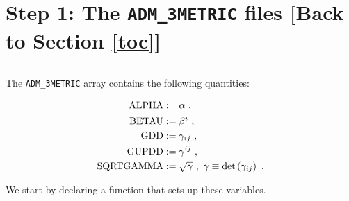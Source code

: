\documentclass[landscape,letterpaper,10pt,english]{article}
\begin{document}
    \section{\texorpdfstring{Step 1: The \texttt{ADM\_3METRIC} files {[}Back
to
Section \ref{toc}{]}}{Step 1: The ADM\_3METRIC files {[}Back to {]}}}\label{step-1-the-adm_3metric-files-back-to-top}

\[\label{adm_3metric_files}\]

The \texttt{ADM\_3METRIC} array contains the following quantities:

\begin{align}
{\rm ALPHA} &:= \alpha\ ,\\
{\rm BETAU} &:= \beta^{i}\ ,\\
{\rm GDD}   &:= \gamma_{ij}\ ,\\
{\rm GUPDD} &:= \gamma^{ij}\ ,\\
{\rm SQRTGAMMA} &:= \sqrt{\gamma} \ ,\ \gamma \equiv \det\left(\gamma_{ij}\right)\ .
\end{align}

We start by declaring a function that sets up these variables.
\end{document}
